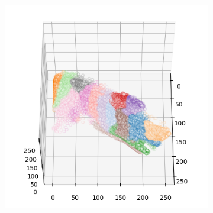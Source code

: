 \begin{figure}[htbp]
\begin{subfigure}[t]{0.32\textwidth}
    \end{subfigure}
    \begin{subfigure}[t]{0.32\textwidth}
        \includegraphics[width=\linewidth]{../../python_code/plots/kmeans/cat-10/clusters_elev60_azim0.png}
    \end{subfigure}
\end{figure}

